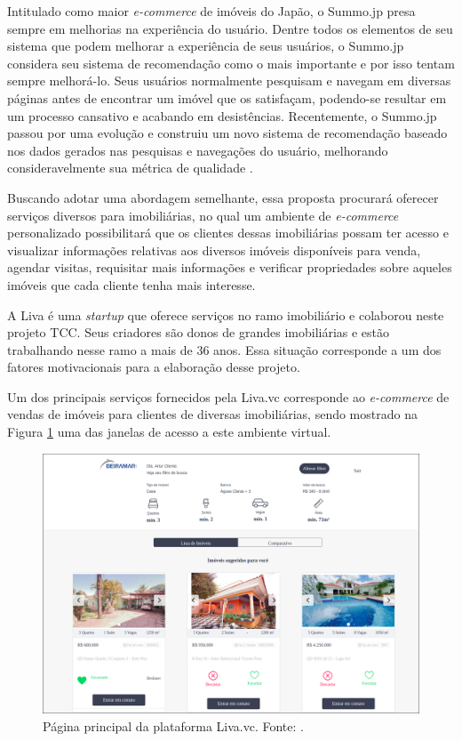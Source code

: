 Intitulado como maior \textit{e-commerce} de imóveis do Japão, o Summo.jp presa sempre em melhorias na experiência do usuário. Dentre todos os elementos de seu sistema que podem melhorar a experiência de seus usuários, o Summo.jp considera seu sistema de recomendação como o mais importante e por isso tentam sempre melhorá-lo. Seus usuários normalmente pesquisam e navegam em diversas páginas antes de encontrar um imóvel que os satisfaçam, podendo-se resultar em um processo cansativo e acabando em desistências. Recentemente, o Summo.jp passou por uma evolução e construiu um novo
sistema de recomendação baseado nos dados gerados nas pesquisas e navegações do usuário, melhorando consideravelmente sua métrica de qualidade \cite{Summo:2017}.

Buscando adotar uma abordagem semelhante, essa proposta procurará oferecer serviços diversos para imobiliárias, no qual um ambiente de \textit{e-commerce} personalizado possibilitará que os clientes dessas imobiliárias possam ter acesso e visualizar informações relativas aos diversos imóveis disponíveis para venda, agendar visitas, requisitar mais informações e verificar propriedades sobre aqueles imóveis que cada cliente tenha mais interesse.

A Liva é uma \textit{startup} que oferece serviços no ramo imobiliário e colaborou neste projeto TCC. Seus criadores são donos de grandes imobiliárias e estão trabalhando nesse ramo a mais de 36 anos. Essa situação corresponde a um dos fatores motivacionais para a elaboração desse projeto.

Um dos principais serviços fornecidos pela Liva.vc corresponde ao \textit{e-commerce} de vendas de imóveis para clientes de diversas imobiliárias, sendo mostrado na Figura \ref{fig:pagina_principal_liva} uma das janelas de acesso a este ambiente virtual.

\begin{figure}[H]
    \centering
    \includegraphics[scale=0.3]{figuras/introducao/pagina_principal_liva.png}
    \caption[Página principal da plataforma Liva.vc]{Página principal da plataforma Liva.vc. Fonte: \cite{Liva:2019}.}
    \label{fig:pagina_principal_liva}
\end{figure}


